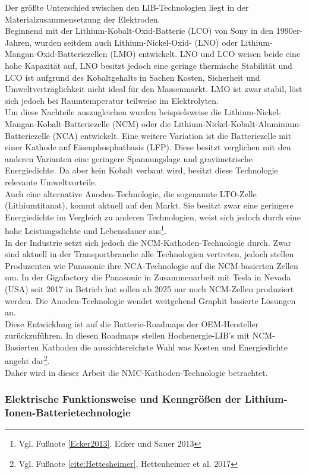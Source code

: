 Der größte Unterschied zwischen den LIB-Technologien liegt in der Materialzusammensetzung der Elektroden.\\
Beginnend mit der Lithium-Kobalt-Oxid-Batterie (LCO) von Sony in den 1990er-Jahren, wurden seitdem auch Lithium-Nickel-Oxid- (LNO) oder Lithium-Mangan-Oxid-Batteriezellen (LMO) entwickelt. LNO und LCO weisen beide eine hohe Kapazität auf, LNO besitzt jedoch eine geringe thermische Stabilität und LCO ist aufgrund des Kobaltgehalts in Sachen Kosten, Sicherheit und Umweltverträglichkeit nicht ideal für den Massenmarkt. LMO ist zwar stabil, löst sich jedoch bei Raumtemperatur teilweise im Elektrolyten. \\
Um diese Nachteile auszugleichen wurden beispielsweise die Lithium-Nickel-Mangan-Kobalt-Batteriezelle (NCM) oder die Lithium-Nickel-Kobalt-Aluminium-Batteriezelle (NCA) entwickelt. Eine weitere Variation ist die Batteriezelle mit einer Kathode auf Eisenphosphatbasis (LFP). Diese besitzt verglichen mit den anderen Varianten eine geringere Spannungslage und gravimetrische Energiedichte. Da aber kein Kobalt verbaut wird, besitzt diese Technologie relevante Umweltvorteile.\\
Auch eine alternative Anoden-Technologie, die sogenannte LTO-Zelle (Lithiumtitanat), kommt aktuell auf den Markt. Sie besitzt zwar eine geringere Energiedichte im Vergleich zu anderen Technologien, weist sich jedoch durch eine hohe Leistungsdichte und Lebensdauer aus\footnote{Vgl. Fußnote \ref{Ecker2013}, Ecker und Sauer 2013}.  \\
In der Industrie setzt sich jedoch die NCM-Kathoden-Technologie durch. Zwar sind aktuell in der Transportbranche alle Technologien vertreten, jedoch stellen Produzenten wie Panasonic ihre NCA-Technologie auf die NCM-basierten Zellen um. In der Gigafactory die Panasonic in Zusammenarbeit mit Tesla in Nevada (USA) seit 2017 in Betrieb hat sollen ab 2025 nur noch NCM-Zellen produziert werden. Die Anoden-Technologie wendet weitgehend Graphit basierte Lösungen an.\\
Diese Entwicklung ist auf die Batterie-Roadmaps der OEM-Hersteller zurückzuführen. In diesen Roadmaps stellen Hochenergie-LIB's mit NCM-Basierten Kathoden die aussichtsreichste Wahl was Kosten und Energiedichte angeht dar\footnote{Vgl. Fußnote \ref{cite:Hettesheimer}, Hettenheimer et al. 2017}. \\
Daher wird in dieser Arbeit die NMC-Kathoden-Technologie betrachtet.%

\subsubsection*{Elektrische Funktionsweise und Kenngrößen der Lithium-Ionen-Batterietechnologie}\label{subsub:ElekChemFunktion}

